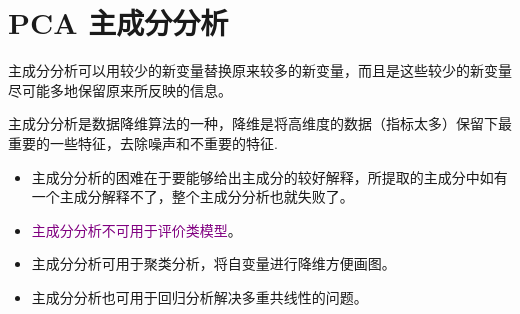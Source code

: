 \section{PCA 主成分分析}

\begin{definition}[主成分分析]
    主成分分析可以用较少的新变量替换原来较多的新变量，而且是这些较少的新变量尽可能多地保留原来所反映的信息。

    主成分分析是数据降维算法的一种，降维是将高维度的数据（指标太多）保留下最重要的一些特征，去除噪声和不重要的特征.
\end{definition}

\begin{warning}
    \begin{itemize}
        \item 主成分分析的困难在于要能够给出主成分的较好解释，所提取的主成分中如有一个主成分解释不了，整个主成分分析也就失败了。
        \item \textcolor{purple}{主成分分析不可用于评价类模型}。
        \item 主成分分析可用于聚类分析，将自变量进行降维方便画图。
        \item 主成分分析也可用于回归分析解决多重共线性的问题。
    \end{itemize}
\end{warning}

